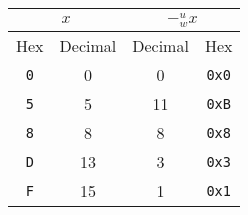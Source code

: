 \documentclass[12pt]{article}
\newenvironment{sol}[1][Solution]{\begin{trivlist}
		\item[\hskip \labelsep {\bfseries #1:}]}{\end{trivlist}}
\begin{document}
\begin{sol}
	\
	\begin{center}
		\begin{tabular}{cccc}
			\multicolumn{2}{c}{$x$} & \multicolumn{2}{c}{$-^u_wx$}\\
			\hline
			Hex & Decimal & Decimal & Hex\\
			\hline
			\texttt{0} & 0 & 0 & \texttt{0x0}\\
			\texttt{5} & 5 & 11 & \texttt{0xB}\\
			\texttt{8} & 8 & 8 & \texttt{0x8}\\
			\texttt{D} & 13 & 3 & \texttt{0x3}\\
			\texttt{F} & 15 & 1 & \texttt{0x1}
		\end{tabular}
	\end{center}
\end{sol}
\end{document}
